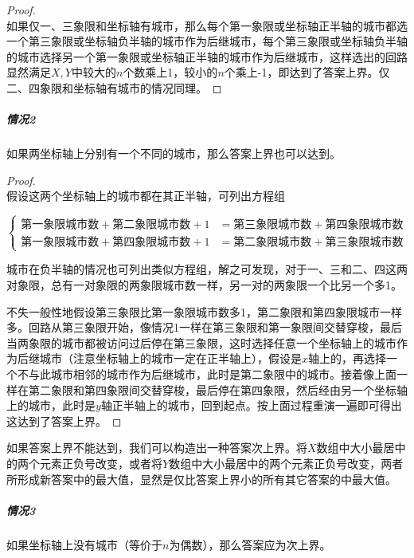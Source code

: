 \documentclass[UTF8]{ctexart}
\theoremstyle{nonumberplain}
\newtheorem{proof}{\hspace{1em}证明：}
\begin{document}
			\begin{proof}\mbox{}\\
			
				如果仅一、三象限和坐标轴有城市，那么每个第一象限或坐标轴正半轴的城市都选一个第三象限或坐标轴负半轴的城市作为后继城市，每个第三象限或坐标轴负半轴的城市选择另一个第一象限或坐标轴正半轴的城市作为后继城市，这样选出的回路显然满足$X,Y$中较大的$n$个数乘上1，较小的$n$个乘上-1，即达到了答案上界。仅二、四象限和坐标轴有城市的情况同理。
			\end{proof}
			
			\subparagraph{情况2}
			如果两坐标轴上分别有一个不同的城市，那么答案上界也可以达到。
			
			\begin{proof}\mbox{}\\
			
				假设这两个坐标轴上的城市都在其正半轴，可列出方程组
				
				$$\left\{\begin{aligned}
					\mbox{第一象限城市数}+\mbox{第二象限城市数}+1&=\mbox{第三象限城市数}+\mbox{第四象限城市数}\\
					\mbox{第一象限城市数}+\mbox{第四象限城市数}+1&=\mbox{第二象限城市数}+\mbox{第三象限城市数}
				\end{aligned}\right.$$
				
				城市在负半轴的情况也可列出类似方程组，解之可发现，对于一、三和二、四这两对象限，总有一对象限的两象限城市数一样，另一对的两象限一个比另一个多1。
				
				不失一般性地假设第三象限比第一象限城市数多1，第二象限和第四象限城市一样多。回路从第三象限开始，像情况1一样在第三象限和第一象限间交替穿梭，最后当两象限的城市都被访问过后停在第三象限，这时选择任意一个坐标轴上的城市作为后继城市（注意坐标轴上的城市一定在正半轴上），假设是$x$轴上的，再选择一个不与此城市相邻的城市作为后继城市，此时是第二象限中的城市。接着像上面一样在第二象限和第四象限间交替穿梭，最后停在第四象限，然后经由另一个坐标轴上的城市，此时是$y$轴正半轴上的城市，回到起点。按上面过程重演一遍即可得出这达到了答案上界。
			\end{proof}
			
			如果答案上界不能达到，我们可以构造出一种答案次上界。将$X$数组中大小最居中的两个元素正负号改变，或者将$Y$数组中大小最居中的两个元素正负号改变，两者所形成新答案中的最大值，显然是仅比答案上界小的所有其它答案的中最大值。
			
			\subparagraph{情况3}
			如果坐标轴上没有城市（等价于$n$为偶数），那么答案应为次上界。
			
\end{document}

